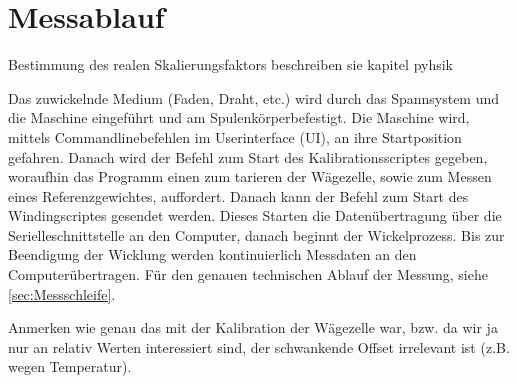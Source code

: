 \section{Messablauf}
\label{sec:Messablauf}



Bestimmung des realen Skalierungsfaktors beschreiben sie kapitel pyhsik


Das zuwickelnde Medium (Faden, Draht, etc.) wird durch das Spannsystem und die Maschine eingeführt und am Spulenkörperbefestigt. Die Maschine wird, mittels Commandlinebefehlen im Userinterface (UI), an ihre Startposition gefahren. Danach wird der Befehl zum Start des Kalibrationsscriptes gegeben, woraufhin das Programm einen zum tarieren der Wägezelle, sowie zum Messen eines Referenzgewichtes, auffordert. Danach kann der Befehl zum Start des Windingscriptes gesendet werden. Dieses Starten die Datenübertragung über die Serielleschnittstelle an den Computer, danach beginnt der Wickelprozess. Bis zur Beendigung der Wicklung werden kontinuierlich Messdaten an den Computerübertragen. Für den genauen technischen Ablauf der Messung, siehe \autoref{sec:Messschleife}. 

Anmerken wie genau das mit der Kalibration der Wägezelle war, bzw. da wir ja nur an relativ Werten interessiert sind, der schwankende Offset irrelevant ist (z.B. wegen Temperatur).